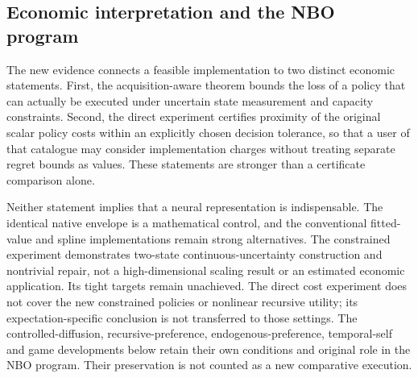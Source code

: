 \subsection{Economic interpretation and the NBO program}
The new evidence connects a feasible implementation to two distinct economic statements. First, the acquisition-aware theorem bounds the loss of a policy that can actually be executed under uncertain state measurement and capacity constraints. Second, the direct experiment certifies proximity of the original scalar policy costs within an explicitly chosen decision tolerance, so that a user of that catalogue may consider implementation charges without treating separate regret bounds as values. These statements are stronger than a certificate comparison alone.

Neither statement implies that a neural representation is indispensable. The identical native envelope is a mathematical control, and the conventional fitted-value and spline implementations remain strong alternatives. The constrained experiment demonstrates two-state continuous-uncertainty construction and nontrivial repair, not a high-dimensional scaling result or an estimated economic application. Its tight targets remain unachieved. The direct cost experiment does not cover the new constrained policies or nonlinear recursive utility; its expectation-specific conclusion is not transferred to those settings. The controlled-diffusion, recursive-preference, endogenous-preference, temporal-self and game developments below retain their own conditions and original role in the NBO program. Their preservation is not counted as a new comparative execution.
